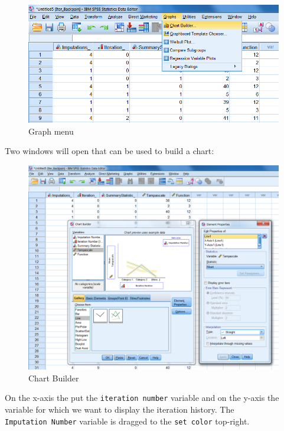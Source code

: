\documentclass[
]{book}
\begin{document}
\begin{figure}

{\centering \includegraphics[width=0.9\linewidth]{images/fig4.13} 

}

\caption{Graph menu}\label{fig:fig4-13}
\end{figure}

Two windows will open that can be used to build a chart:

\begin{figure}

{\centering \includegraphics[width=0.9\linewidth]{images/fig4.14} 

}

\caption{Chart Builder}\label{fig:fig4-14}
\end{figure}

On the x-axis the put the \texttt{iteration\ number} variable and on the y-axis the variable for which we want to display the iteration history. The \texttt{Imputation\ Number} variable is dragged to the \texttt{set\ color} top-right.
\end{document}
